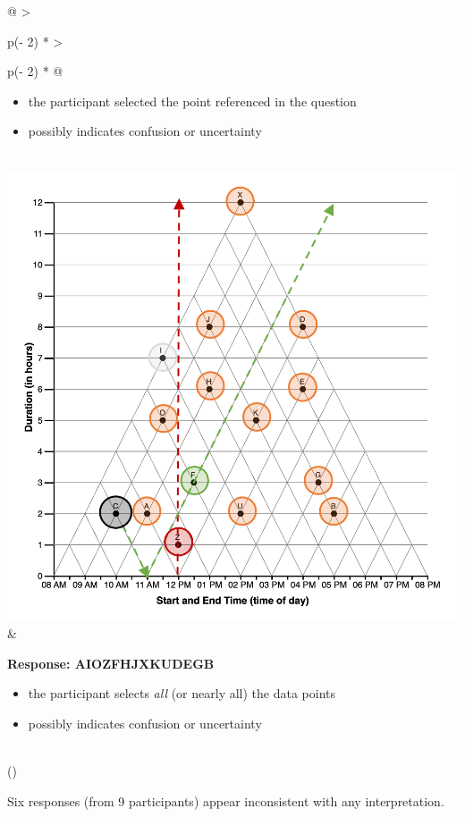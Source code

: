 \documentclass[
  letterpaper,
  DIV=11,
  numbers=noendperiod]{scrreprt}
\providecommand{\tightlist}{%
  \setlength{\itemsep}{0pt}\setlength{\parskip}{0pt}}\usepackage{longtable,booktabs,array}
\begin{document}
\begin{longtable}[]{@{}
  >{\raggedright\arraybackslash}p{(\columnwidth - 2\tabcolsep) * }
  >{\raggedright\arraybackslash}p{(\columnwidth - 2\tabcolsep) * }@{}}
\begin{minipage}[t]{\linewidth}
\begin{itemize}
\tightlist
\item
  the participant selected the point referenced in the question
\item
  possibly indicates confusion or uncertainty
\end{itemize}
\end{minipage} \\
\includegraphics{analysis/SGC3A/static/interpretations/Q3_111_frenzy.png}
& \begin{minipage}[t]{\linewidth}\raggedright
\textbf{Response: AIOZFHJXKUDEGB}

\begin{itemize}
\tightlist
\item
  the participant selects \emph{all} (or nearly all) the data points
\item
  possibly indicates confusion or uncertainty
\end{itemize}
\end{minipage} \\
\bottomrule()
\end{longtable}

Six responses (from 9 participants) appear inconsistent with any
interpretation.
\end{document}
